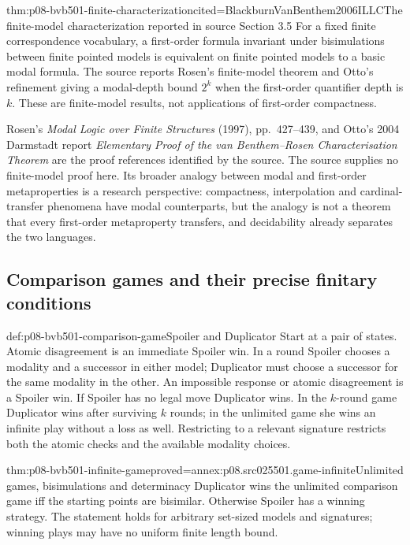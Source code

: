 \begin{hbtheorem}{thm:p08-bvb501-finite-characterization}{cited=BlackburnVanBenthem2006ILLC}{The finite-model characterization reported in source Section 3.5}
For a fixed finite correspondence vocabulary, a first-order formula
invariant under bisimulations between finite pointed models is equivalent
on finite pointed models to a basic modal formula. The source reports
Rosen's finite-model theorem and Otto's refinement giving a modal-depth
bound \(2^k\) when the first-order quantifier depth is \(k\).
These are finite-model results, not applications of first-order compactness.
\end{hbtheorem}

Rosen's \emph{Modal Logic over Finite Structures} (1997), pp.~427--439,
and Otto's 2004 Darmstadt report \emph{Elementary Proof of the van
Benthem--Rosen Characterisation Theorem} are the proof references identified
by the source. The source supplies no finite-model proof here.
Its broader analogy between modal and first-order metaproperties is
a research perspective: compactness, interpolation and cardinal-transfer
phenomena have modal counterparts, but the analogy is not a theorem
that every first-order metaproperty transfers, and decidability already
separates the two languages.

\subsection{Comparison games and their precise finitary conditions}
\label{sec:p08-bvb501-comparison-games}

\begin{hbdefinition}{def:p08-bvb501-comparison-game}{Spoiler and Duplicator}
Start at a pair of states. Atomic disagreement is an immediate Spoiler win.
In a round Spoiler chooses a modality and a successor in either model;
Duplicator must choose a successor for the same modality in the other.
An impossible response or atomic disagreement is a Spoiler win. If Spoiler
has no legal move Duplicator wins. In the \(k\)-round game Duplicator
wins after surviving \(k\) rounds; in the unlimited game she wins an
infinite play without a loss as well. Restricting to a relevant signature
restricts both the atomic checks and the available modality choices.
\end{hbdefinition}

\begin{hbtheorem}{thm:p08-bvb501-infinite-game}{proved=annex:p08.src025501.game-infinite}{Unlimited games, bisimulations and determinacy}
Duplicator wins the unlimited comparison game iff the starting points are
bisimilar. Otherwise Spoiler has a winning strategy. The statement holds
for arbitrary set-sized models and signatures; winning plays may have no
uniform finite length bound.
\end{hbtheorem}

